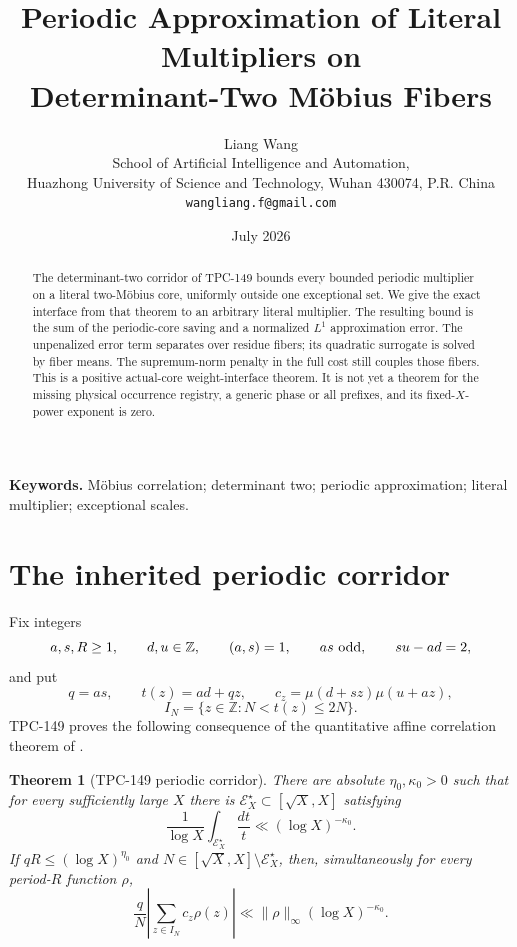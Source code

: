 \documentclass[11pt]{article}
\title{\textbf{Periodic Approximation of Literal Multipliers on\\
Determinant-Two M\"obius Fibers}}
\author{Liang Wang\\
\small School of Artificial Intelligence and Automation,\\[-2pt]
\small Huazhong University of Science and Technology, Wuhan 430074, P.R. China\\
\small \texttt{wangliang.f@gmail.com}}
\date{July 2026}
\newtheorem{theorem}{Theorem}[section]
\theoremstyle{definition}
\newcommand{\E}{\mathcal E}
\newcommand{\norm}[1]{\lVert#1\rVert}
\begin{document}
\maketitle

\begin{abstract}
The determinant-two corridor of TPC-149 bounds every bounded periodic
multiplier on a literal two-M\"obius core, uniformly outside one
exceptional set.  We give the exact interface from that theorem to an
arbitrary literal multiplier.  The resulting bound is the sum of the
periodic-core saving and a normalized \(L^1\) approximation error.
The unpenalized error term separates over residue fibers; its
quadratic surrogate is solved by fiber means.  The supremum-norm
penalty in the full cost still couples those fibers.  This is a positive
actual-core weight-interface theorem.  It is not yet a theorem for
the missing physical occurrence registry, a generic phase or all
prefixes, and its fixed-\(X\)-power exponent is zero.
\end{abstract}

\noindent\textbf{Keywords.}
M\"obius correlation; determinant two; periodic approximation;
literal multiplier; exceptional scales.

\medskip
\noindent{}

\section{The inherited periodic corridor}

Fix integers
\[
 a,s,R\ge1,\qquad d,u\in\mathbb Z,\qquad
 (a,s)=1,\qquad as\ {\rm odd},\qquad su-ad=2,
\]
and put
\[
 q=as,\qquad t(z)=ad+qz,\qquad
 c_z=\mu(d+sz)\mu(u+az),
\]
\[
 I_N=\{z\in\mathbb Z:N<t(z)\le2N\}.
\]
TPC-149 proves the following consequence of the quantitative affine
correlation theorem of \citet{TaoTeravainen2026}.

\begin{theorem}[TPC-149 periodic corridor]\label{thm:149}
There are absolute \(\eta_0,\kappa_0>0\) such that for every
sufficiently large \(X\) there is
\(\E_X^\star\subset[\sqrt X,X]\) satisfying
\[
 \frac1{\log X}\int_{\E_X^\star}\frac{dt}{t}
 \ll(\log X)^{-\kappa_0}.
\]
If \(qR\le(\log X)^{\eta_0}\) and
\(N\in[\sqrt X,X]\setminus\E_X^\star\), then, simultaneously for
every period-\(R\) function \(\rho\),
\begin{equation}
 \frac qN\left|\sum_{z\in I_N}c_z\rho(z)\right|
 \ll\norm{\rho}_\infty(\log X)^{-\kappa_0}.
\label{eq:periodic}
\end{equation}
\end{theorem}
\end{document}
